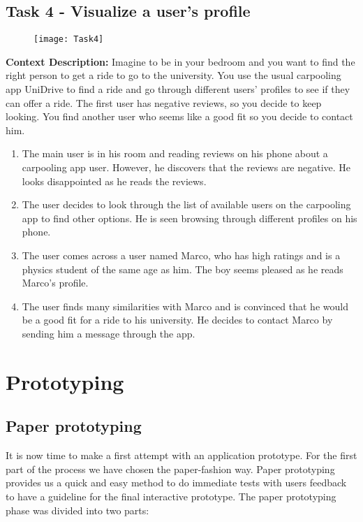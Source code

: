 \documentclass{article}
\begin{document}
\subsection{Task 4 - Visualize a user's profile}

\begin{figure}[htbp]
  \centering
     \texttt{[image: Task4]}
\end{figure}

\textbf{Context Description:} Imagine to be in your bedroom and you want to find the right person to get a ride to go to the university. You use the usual carpooling app UniDrive to find a ride and go through different users' profiles to see if they can offer a ride. The first user has negative reviews, so you decide to keep looking. You find another user who seems like a good fit so you decide to contact him.

\begin{enumerate}
    \item The main user is in his room and reading reviews on his phone about a carpooling app user. However, he discovers that the reviews are negative. He looks disappointed as he reads the reviews.
    \item The user decides to look through the list of available users on the carpooling app to find other options. He is seen browsing through different profiles on his phone.
    \item The user comes across a user named Marco, who has high ratings and is a physics student of the same age as him. The boy seems pleased as he reads Marco's profile.
    \item The user finds many similarities with Marco and is convinced that he would be a good fit for a ride to his university. He decides to contact Marco by sending him a message through the app.
\end{enumerate}

\section{Prototyping}

\subsection{Paper prototyping}
It is now time to make a first attempt with an application prototype. For the first part of the process we have chosen the paper-fashion way. Paper prototyping provides us a quick and easy method to do immediate tests with users feedback to have a guideline for the final interactive prototype. The paper prototyping phase was divided into two parts:
\end{document}
